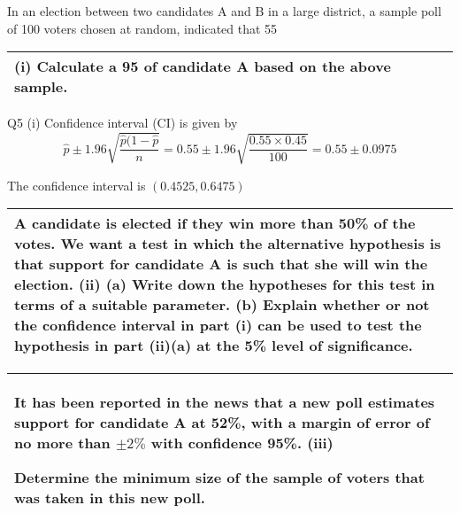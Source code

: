 \documentclass[a4paper,12pt]{article}
\begin{document}
In an election between two candidates A and B in a large district, a sample poll of 100
voters chosen at random, indicated that 55%


\newpage

\begin{table}[ht!]
 \centering
 \begin{tabular}{|p{15cm}|}
 \hline  
(i)
Calculate a 95%
of candidate A based on the above sample. 
 \\ \hline
  \end{tabular}
\end{table}




Q5
(i)
Confidence interval (CI) is given by
\[ \hat{p} \pm 1.96 \sqrt{ \frac{\hat{p} (1 - \hat{p}}{n} }  = 

0.55 \pm 1.96 \sqrt{ \frac{0.55 \times 0.45 }{100} } = 0.55 \pm 0.0975 \]

The confidence interval is $(0.4525, 0.6475)$

\newpage

\begin{table}[ht!]
 \centering
 \begin{tabular}{|p{15cm}|}
 \hline  
 A candidate is elected if they win more than 50\% of the votes. We want a test in which
the alternative hypothesis is that support for candidate A is such that she will win the
election.
(ii)
(a) Write down the hypotheses for this test in terms of a suitable
parameter.
(b) Explain whether or not the confidence interval in part (i) can be used to
test the hypothesis in part (ii)(a) at the 5\% level of significance.

 \\ \hline
  \end{tabular}
\end{table}


\newpage

\begin{table}[ht!]
 \centering
 \begin{tabular}{|p{15cm}|}
 \hline  
 
It has been reported in the news that a new poll estimates support for candidate A at
52\%, with a margin of error of no more than $\pm 2\%$ with confidence 95\%.
(iii)

Determine the minimum size of the sample of voters that was taken in this
new poll.
 \\ \hline
  \end{tabular}
\end{table}
\end{document}
